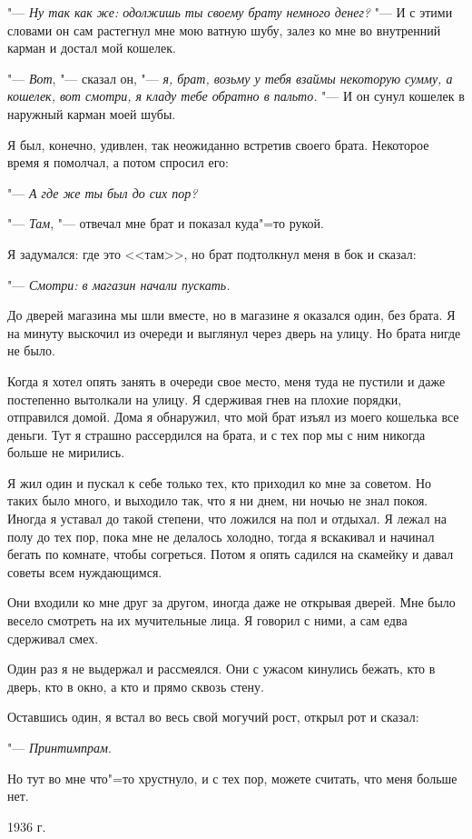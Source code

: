 "--- \textit{Ну так как же: одолжишь ты своему брату немного денег?} "--- И с этими словами он сам растегнул мне мою ватную шубу, залез ко мне во внутренний карман и достал мой кошелек.

"--- \textit{Вот}, "--- сказал он, "--- \textit{я, брат, возьму у тебя взаймы некоторую сумму, а кошелек, вот смотри, я кладу тебе обратно в пальто.} "--- И он сунул кошелек в наружный карман моей шубы.

Я был, конечно, удивлен, так неожиданно встретив своего брата. Некоторое время я помолчал, а потом спросил его:

"--- \textit{А где же ты был до сих пор?}

"--- \textit{Там}, "--- отвечал мне брат и показал куда"=то рукой.

Я задумался: где это <<там>>, но брат подтолкнул меня в бок и сказал:

"--- \textit{Смотри: в магазин начали пускать.}

До дверей магазина мы шли вместе, но в магазине я оказался один, без брата. Я на минуту выскочил из очереди и выглянул через дверь на улицу. Но брата нигде не было.

Когда я хотел опять занять в очереди свое место, меня туда не пустили и даже постепенно вытолкали на улицу. Я сдерживая гнев на плохие порядки, отправился домой. Дома я обнаружил, что мой брат изъял из моего кошелька все деньги. Тут я страшно рассердился на брата, и с тех пор мы с ним никогда больше не мирились.

Я жил один и пускал к себе только тех, кто приходил ко мне за советом. Но таких было много, и выходило так, что я ни днем, ни ночью не знал покоя. Иногда я уставал до такой степени, что ложился на пол и отдыхал. Я лежал на полу до тех пор, пока мне не делалось холодно, тогда я вскакивал и начинал бегать по комнате, чтобы согреться. Потом я опять садился на скамейку и давал советы всем нуждающимся.

Они входили ко мне друг за другом, иногда даже не открывая дверей. Мне было весело смотреть на их мучительные лица. Я говорил с ними, а сам едва сдерживал смех.

Один раз я не выдержал и рассмеялся. Они с ужасом кинулись бежать, кто в дверь, кто в окно, а кто и прямо сквозь стену.

Оставшись один, я встал во весь свой могучий рост, открыл рот и сказал:

"--- \textit{Принтимпрам}.

Но тут во мне что"=то хрустнуло, и с тех пор, можете считать, что меня больше нет.

\begin{flushright}
1936 г.
\end{flushright}